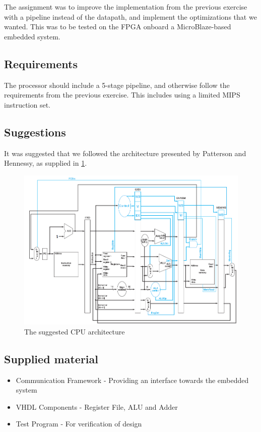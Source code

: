 The assignment was to improve the implementation from the previous exercise with
a pipeline instead of the datapath, and implement the optimizations that we
wanted. This was to be tested on the FPGA onboard a MicroBlaze-based embedded
system.

\subsection{Requirements}
The processor should include a 5-stage pipeline, and otherwise follow the
requirements from the previous exercise. This includes using a limited MIPS
instruction set.

\subsection{Suggestions}
It was suggested that we followed the architecture presented by Patterson and
Hennessy, as supplied in \ref{fig:suggestedArchitecture}.

\begin{figure}[ht]
    \centering
    \includegraphics[width=\textwidth]{figures/SuggestedArchitecture.png}
    \caption{The suggested CPU architecture} 
    \label{fig:suggestedArchitecture}
\end{figure}


\subsection{Supplied material}
\begin{itemize}
\item Communication Framework -  Providing an interface towards the embedded system
\item VHDL Components - Register File, ALU and Adder
\item Test Program - For verification of design
\end{itemize}
